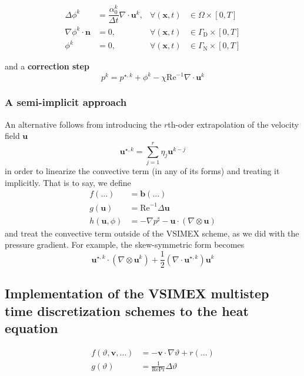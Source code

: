 \documentclass[]{scrartcl}
\newcommand{\bs}[1]{\boldsymbol{#1}}
\begin{document}
\begin{align}
\Delta \phi^{k} &= \dfrac{\alpha_0^k}{\Delta t} \nabla \cdot \bs{u}^{k},  &\forall (\bs{x}, t) &\in \Omega \times \left[0, T \right] \label{Eqn:VSIMEXProjectionStep} \\
\nabla \phi^{k} \cdot \bs{n} &= 0, &\forall (\bs{x}, t) &\in \Gamma_\textrm{D} \times \left[0, T \right] \nonumber \\
\phi^{k} &= 0, &\forall\left(\bs{x}, t\right) &\in \Gamma_\textrm{N} \times \left[0, T \right] \nonumber
\end{align}

and a \textbf{correction step}
\begin{equation}\label{Eqn:VSIMEXCorrectionStep}
	p^{k} = p^{\star, k} + \phi^{k} - \chi\textrm{Re}^{-1} \nabla \cdot \bs{u}^{k}
\end{equation}
\subsubsection{A semi-implicit approach}\label{Sec:SemiImplicit}
An alternative follows from introducing the $r$th-oder extrapolation of the velocity field $\bs{u}$ 
\begin{equation*}
\bs{u}^{\star, k} = \sum_{j=1}^{r} \eta_j \bs{u}^{k-j}
\end{equation*}
in order to linearize the convective term (in any of its forms) and treating it implicitly. That is to say, we define
\begin{equation*}
\begin{aligned}
f(\dots) &= \bs{b}(\dots) \\
g(\bs{u}) &= \textrm{Re}^{-1} \Delta \bs{u}\\
h(\bs{u}, \phi) &= -\nabla p^\sharp - \bs{u} \cdot (\nabla \otimes \bs{u})
\end{aligned}
\end{equation*}
and treat the convective term outside of the VSIMEX scheme, as we did with the pressure gradient. For example, the skew-symmetric form becomes
\begin{equation*}
	\bs{u}^{\star, k} \cdot (\nabla \otimes \bs{u}^{k}) + \dfrac{1}{2} (\nabla \cdot \bs{u}^{\star, k})\bs{u}^{k}
\end{equation*}
\subsection{Implementation of the VSIMEX multistep time discretization schemes to the heat equation}
\begin{equation*}
	\begin{aligned}
		f(\vartheta, \bs{v}, \dots) &= -\bs{v} \cdot \nabla \vartheta + r(\dots) \\
		g(\vartheta) &= \frac{1}{\textrm{Re}\textrm{Pr}} \Delta \vartheta
	\end{aligned}
\end{equation*}
\end{document}
